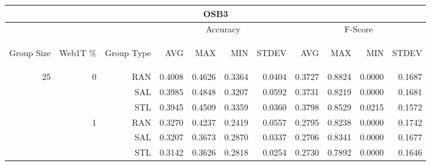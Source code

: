 \begin{center}
\begin{table}[htbp] 
 \begin{center}
\begin{tabular}{ | r | r | r | r | r | r | r | r | r | r | r |}
\hline
\multicolumn{11}{|c|}{OSB3}\\
\hline
 & & & \multicolumn{4}{|c|}{Accuracy} & \multicolumn{4}{|c|}{F-Score}\\ \cline{4-11}
\begin{sideways}Group Size\end{sideways} & \begin{sideways}Web1T \%\end{sideways} & \begin{sideways}Group Type\end{sideways} & \begin{sideways}AVG\end{sideways} & \begin{sideways}MAX\end{sideways} & \begin{sideways}MIN\end{sideways} & \begin{sideways}STDEV\end{sideways} & \begin{sideways}AVG\end{sideways} & \begin{sideways}MAX\end{sideways} & \begin{sideways}MIN\end{sideways} & \begin{sideways}STDEV\end{sideways}\\
\hline
\multirow{18}{*}{25}
 & \multirow{3}{*}{0} & RAN & 0.4008 & 0.4626 & 0.3364 & 0.0404 & 0.3727 & 0.8824 & 0.0000 & 0.1687\\ \cline{3-11}
 &   & SAL & 0.3985 & 0.4848 & 0.3207 & 0.0592 & 0.3731 & 0.8219 & 0.0000 & 0.1681\\ \cline{3-11}
 &   & STL & 0.3945 & 0.4509 & 0.3359 & 0.0360 & 0.3798 & 0.8529 & 0.0215 & 0.1572\\ \cline{2-11}
 & \multirow{3}{*}{1} & RAN & 0.3270 & 0.4237 & 0.2419 & 0.0557 & 0.2795 & 0.8238 & 0.0000 & 0.1742\\ \cline{3-11}
 &   & SAL & 0.3207 & 0.3673 & 0.2870 & 0.0337 & 0.2706 & 0.8341 & 0.0000 & 0.1677\\ \cline{3-11}
 &   & STL & 0.3142 & 0.3626 & 0.2818 & 0.0254 & 0.2730 & 0.7892 & 0.0000 & 0.1646\\ \cline{2-11}

\end{tabular}
\end{center}
\end{table}
\end{center}
